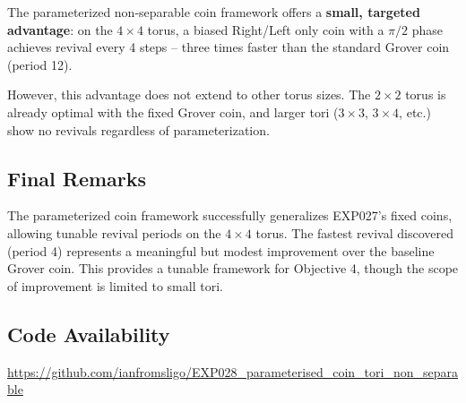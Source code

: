 \documentclass[12pt]{article}
\begin{document}
The parameterized non-separable coin framework offers a \textbf{small, targeted advantage}: on the $4 \times 4$ torus, a biased Right/Left only coin with a $\pi/2$ phase achieves revival every 4 steps – three times faster than the standard Grover coin (period 12).

However, this advantage does not extend to other torus sizes. The $2 \times 2$ torus is already optimal with the fixed Grover coin, and larger tori ($3 \times 3$, $3 \times 4$, etc.) show no revivals regardless of parameterization.

\subsection{Final Remarks}

The parameterized coin framework successfully generalizes EXP027's fixed coins, allowing tunable revival periods on the $4 \times 4$ torus. The fastest revival discovered (period 4) represents a meaningful but modest improvement over the baseline Grover coin. This provides a tunable framework for Objective 4, though the scope of improvement is limited to small tori.

\subsection*{Code Availability}
\url{https://github.com/ianfromsligo/EXP028_parameterised_coin_tori_non_separable}
\end{document}
